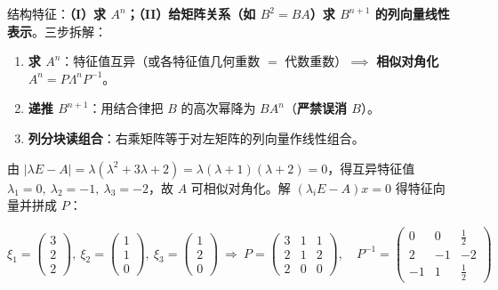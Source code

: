 \documentclass[10pt,a4paper]{ctexart}
\begin{document}

结构特征：\textbf{（I）求 $A^n$；（II）给矩阵关系（如 $B^2=BA$）求 $B^{n+1}$ 的列向量线性表示}。三步拆解：

\begin{enumerate}

\item \textbf{求 $A^n$}：特征值互异（或各特征值几何重数 $=$ 代数重数）$\implies$ \textbf{相似对角化} $A^n=P\Lambda^n P^{-1}$。

\item \textbf{递推 $B^{n+1}$}：用结合律把 $B$ 的高次幂降为 \textbf{$BA^n$}（\textbf{严禁误消 $B$}）。

\item \textbf{列分块读组合}：右乘矩阵等于对左矩阵的列向量作线性组合。

\end{enumerate}



由 $|\lambda E-A|=\lambda(\lambda^2+3\lambda+2)=\lambda(\lambda+1)(\lambda+2)=0$，得互异特征值 $\lambda_1=0,\ \lambda_2=-1,\ \lambda_3=-2$，故 $A$ 可相似对角化。解 $(\lambda_i E-A)x=0$ 得特征向量并拼成 $P$：

\[
\xi_1=\begin{pmatrix}3\\2\\2\end{pmatrix},\ \xi_2=\begin{pmatrix}1\\1\\0\end{pmatrix},\ \xi_3=\begin{pmatrix}1\\2\\0\end{pmatrix}\ \Longrightarrow\ P=\begin{pmatrix}3&1&1\\2&1&2\\2&0&0\end{pmatrix},\quad P^{-1}=\begin{pmatrix}0&0&\frac{1}{2}\\2&-1&-2\\-1&1&\frac{1}{2}\end{pmatrix}
\]
\end{document}
